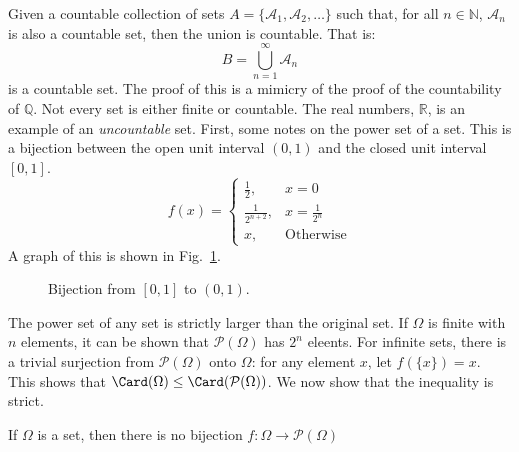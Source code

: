     Given a countable collection of sets
    $A=\{\mathcal{A}_{1},\mathcal{A}_{2},\hdots\}$ such
    that, for all $n\in\mathbb{N}$, $\mathcal{A}_{n}$ is
    also a countable set, then the union is countable. That is:
    \begin{equation}
        B=\bigcup_{n=1}^{\infty}\mathcal{A}_{n}
    \end{equation}
    is a countable set. The proof of this is a mimicry of
    the proof of the countability of $\mathbb{Q}$. Not
    every set is either finite or countable. The real numbers,
    $\mathbb{R}$, is an example of an \textit{uncountable}
    set. First, some notes on the power set of a set.
    This is a bijection between the open unit interval $(0,1)$ and
    the closed unit interval $[0,1]$.
    \begin{equation}
        f(x)=
        \begin{cases}
            \frac{1}{2},&x=0\\
            \frac{1}{2^{n+2}},&x=\frac{1}{2^{n}}\\
            x,&\textrm{Otherwise}
        \end{cases}
    \end{equation}
    A graph of this is shown in
    Fig.~\ref{fig:Measure_Theory_Bijection_Closed_I_to_Open}.
    \begin{figure}[H]
        \centering
        \captionsetup{type=figure}
        
        \caption{Bijection from $[0,1]$ to $(0,1)$.}
        \label{fig:Measure_Theory_Bijection_Closed_I_to_Open}
    \end{figure}
    The power set of any set is strictly larger than the
    original set. If $\Omega$ is finite with $n$ elements, it
    can be shown that $\mathcal{P}(\Omega)$ has $2^{n}$
    eleents. For infinite sets, there is a trivial surjection
    from $\mathcal{P}(\Omega)$ onto $\Omega$: for any element
    $x$, let $f(\{x\})=x$. This shows that
    $\Card(\Omega)\leq\Card(\mathcal{P}(\Omega))$. We now show
    that the inequality is strict.
    \begin{theorem}
        If $\Omega$ is a set, then there is no bijection
        $f:\Omega\rightarrow\mathcal{P}(\Omega)$
    \end{theorem}
